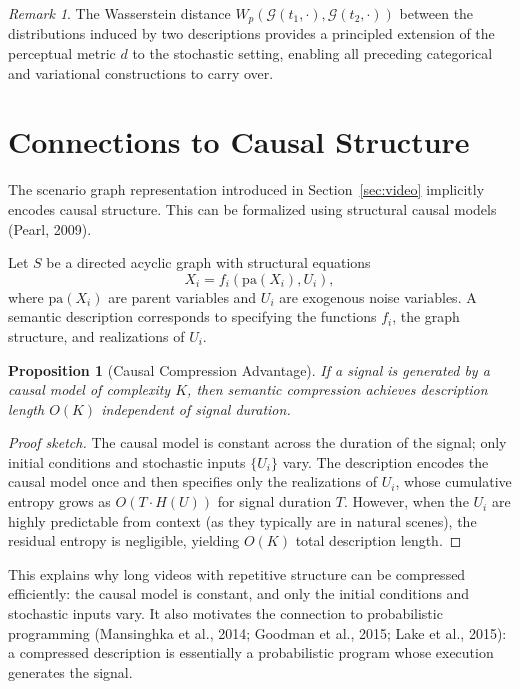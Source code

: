 \documentclass[11pt,a4paper]{article}
\newtheorem{proposition}[theorem]{Proposition}
\theoremstyle{definition}
\theoremstyle{remark}
\newtheorem{remark}[theorem]{Remark}
\begin{document}
\begin{remark}
The Wasserstein distance $W_p(\mathcal{G}(t_1, \cdot), \mathcal{G}(t_2, \cdot))$ between the distributions induced by two descriptions provides a principled extension of the perceptual metric $d$ to the stochastic setting, enabling all preceding categorical and variational constructions to carry over.
\end{remark}

\section{Connections to Causal Structure}
\label{sec:causal}

The scenario graph representation introduced in Section~\ref{sec:video} implicitly encodes causal structure. This can be formalized using structural causal models (Pearl, 2009).

Let $S$ be a directed acyclic graph with structural equations
\[
X_i = f_i(\mathrm{pa}(X_i), U_i),
\]
where $\mathrm{pa}(X_i)$ are parent variables and $U_i$ are exogenous noise variables. A semantic description corresponds to specifying the functions $f_i$, the graph structure, and realizations of $U_i$.

\begin{proposition}[Causal Compression Advantage]
If a signal is generated by a causal model of complexity $K$, then semantic compression achieves description length $O(K)$ independent of signal duration.
\end{proposition}

\begin{proof}[Proof sketch]
The causal model is constant across the duration of the signal; only initial conditions and stochastic inputs $\{U_i\}$ vary. The description encodes the causal model once and then specifies only the realizations of $U_i$, whose cumulative entropy grows as $O(T \cdot H(U))$ for signal duration $T$. However, when the $U_i$ are highly predictable from context (as they typically are in natural scenes), the residual entropy is negligible, yielding $O(K)$ total description length.
\end{proof}

This explains why long videos with repetitive structure can be compressed efficiently: the causal model is constant, and only the initial conditions and stochastic inputs vary. It also motivates the connection to probabilistic programming (Mansinghka et al., 2014; Goodman et al., 2015; Lake et al., 2015): a compressed description is essentially a probabilistic program whose execution generates the signal.
\end{document}
